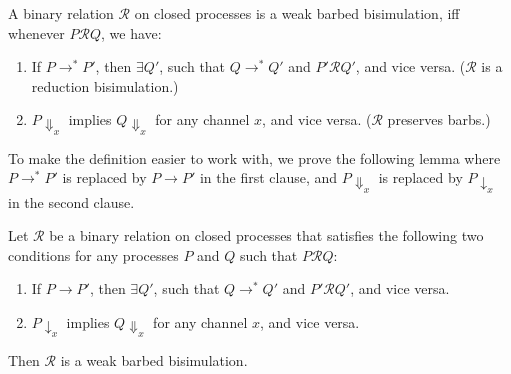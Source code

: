 \documentclass{LMCS}
\renewcommand{\_}{\mathord{\rule[-.25ex]{1ex}{.15ex}}}
\newcommand{\reduces}{\longrightarrow}
\newcommand{\R}{\mathrel{\mathcal{R}}}
\newcommand{\weakbarb}[2]{#1\!\Downarrow_{#2}}
\newcommand{\barb}[2]{#1\!\downarrow_{#2}}
\begin{document}
\begin{defi}
\label{def.joinpi.bisi}
  A binary relation $\R$ on closed processes is a weak barbed
  bisimulation, iff whenever $P\R Q$, we have:
  \begin{enumerate}[(1)]
  \item If $P\reduces^* P'$, then $\exists Q'$, such that $Q\reduces^*
    Q'$ and $P'\R Q'$, and vice versa. ($\R$ is a reduction
    bisimulation.)
  \item $\weakbarb{P}{x}$ implies $\weakbarb{Q}{x}$ for any channel
    $x$, and vice versa. ($\R$ preserves barbs.)
  \end{enumerate}
\end{defi}
To make the definition easier to work with, we prove the following
lemma where $P\reduces^* P'$ is replaced by $P\reduces P'$ in the
first clause, and $\weakbarb{P}{x}$ is replaced by $\barb{P}{x}$ in
the second clause.
\begin{lem}\label{lemma.joinpi.bisi}
  Let $\R$ be a binary relation on closed processes that satisfies the
  following two conditions for any processes $P$ and $Q$ such that
  $P \R Q$:
  \begin{enumerate}[\em(1)]
  \item If $P\reduces P'$, then $\exists Q'$, such that $Q\reduces^*
    Q'$ and $P'\R Q'$, and vice versa.
  \item $\barb{P}{x}$ implies $\weakbarb{Q}{x}$ for any channel $x$,
    and vice versa.
  \end{enumerate}
  Then $\R$ is a weak barbed bisimulation.
\end{lem}
\end{document}
